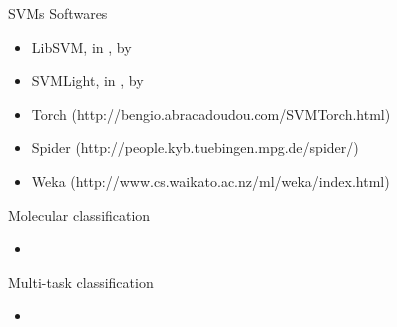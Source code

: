 \documentclass[first=dgreen,second=purple,logo=yellowexc]{aaltoslides}
\begin{document}
{\begin{frame}{SVMs Softwares}
	\begin{itemize}
		\item LibSVM, in \cpp, by \citet{Chang11libsvm}
		\item SVMLight, in \ccc, by \citet{Joachims98making}
		\item Torch (http://bengio.abracadoudou.com/SVMTorch.html)
		\item Spider (http://people.kyb.tuebingen.mpg.de/spider/)
		\item Weka (http://www.cs.waikato.ac.nz/ml/weka/index.html)
	\end{itemize}
\end{frame}

\begin{frame}{Molecular classification}
	\begin{itemize}
		\item
	\end{itemize}
\end{frame}

\begin{frame}{Multi-task classification}
	\begin{itemize}
		\item 
	\end{itemize}
\end{frame}

}
\end{document}
